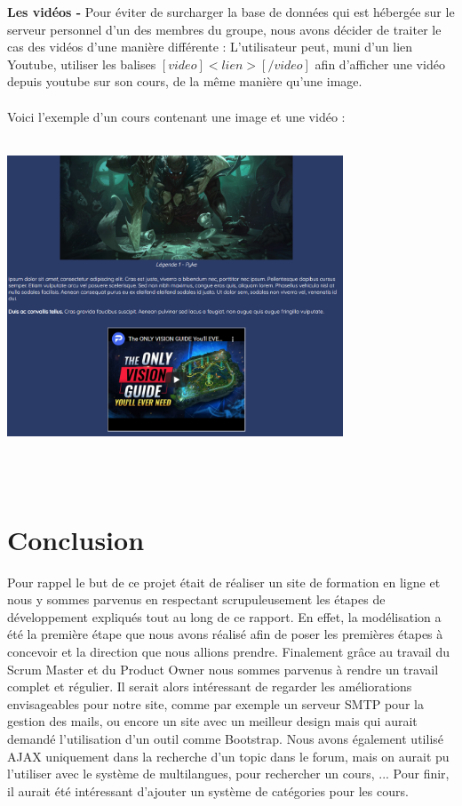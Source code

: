 \documentclass[a4paper,11pt]{article}
\begin{document}
\textbf{Les vidéos - }Pour éviter de surcharger la base de données qui est hébergée sur le serveur personnel d'un des membres du groupe, nous avons décider de traiter le cas des vidéos d'une manière différente : L'utilisateur peut, muni d'un lien Youtube, utiliser les balises $[video]<lien>[/video]$ afin d'afficher une vidéo depuis youtube sur son cours, de la même manière qu'une image.\\\\
Voici l'exemple d'un cours contenant une image et une vidéo :\\\\
\centerline{
    \includegraphics[width=10cm]{images/imageVideo.png}
}\\\\

\section{Conclusion}
Pour rappel le but de ce projet était de réaliser un site de formation en ligne et nous y sommes parvenus en respectant scrupuleusement les étapes de développement expliqués tout au long de ce rapport. En effet, la modélisation a été la première étape que nous avons réalisé afin de poser les premières étapes à concevoir et la direction que nous allions prendre. Finalement grâce au travail du Scrum Master et du Product Owner nous sommes parvenus à rendre un travail complet et régulier. Il serait alors intéressant de regarder les améliorations envisageables pour notre site, comme par exemple un serveur SMTP pour la gestion des mails, ou encore un site avec un meilleur design mais qui aurait demandé l'utilisation d'un outil comme Bootstrap. Nous avons également utilisé AJAX uniquement dans la recherche d'un topic dans le forum, mais on aurait pu l'utiliser avec le système de multilangues, pour rechercher un cours, ... Pour finir, il aurait été intéressant d'ajouter un système de catégories pour les cours.
\end{document}
